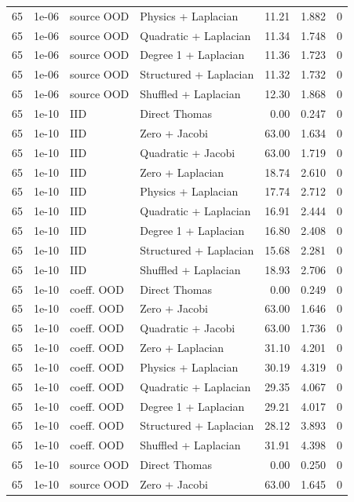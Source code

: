 \begin{longtable}{rlllrrr}
65 & 1e-06 & source OOD & Physics + Laplacian & 11.21 & 1.882 & 0 \\
65 & 1e-06 & source OOD & Quadratic + Laplacian & 11.34 & 1.748 & 0 \\
65 & 1e-06 & source OOD & Degree 1 + Laplacian & 11.36 & 1.723 & 0 \\
65 & 1e-06 & source OOD & Structured + Laplacian & 11.32 & 1.732 & 0 \\
65 & 1e-06 & source OOD & Shuffled + Laplacian & 12.30 & 1.868 & 0 \\
65 & 1e-10 & IID & Direct Thomas & 0.00 & 0.247 & 0 \\
65 & 1e-10 & IID & Zero + Jacobi & 63.00 & 1.634 & 0 \\
65 & 1e-10 & IID & Quadratic + Jacobi & 63.00 & 1.719 & 0 \\
65 & 1e-10 & IID & Zero + Laplacian & 18.74 & 2.610 & 0 \\
65 & 1e-10 & IID & Physics + Laplacian & 17.74 & 2.712 & 0 \\
65 & 1e-10 & IID & Quadratic + Laplacian & 16.91 & 2.444 & 0 \\
65 & 1e-10 & IID & Degree 1 + Laplacian & 16.80 & 2.408 & 0 \\
65 & 1e-10 & IID & Structured + Laplacian & 15.68 & 2.281 & 0 \\
65 & 1e-10 & IID & Shuffled + Laplacian & 18.93 & 2.706 & 0 \\
65 & 1e-10 & coeff. OOD & Direct Thomas & 0.00 & 0.249 & 0 \\
65 & 1e-10 & coeff. OOD & Zero + Jacobi & 63.00 & 1.646 & 0 \\
65 & 1e-10 & coeff. OOD & Quadratic + Jacobi & 63.00 & 1.736 & 0 \\
65 & 1e-10 & coeff. OOD & Zero + Laplacian & 31.10 & 4.201 & 0 \\
65 & 1e-10 & coeff. OOD & Physics + Laplacian & 30.19 & 4.319 & 0 \\
65 & 1e-10 & coeff. OOD & Quadratic + Laplacian & 29.35 & 4.067 & 0 \\
65 & 1e-10 & coeff. OOD & Degree 1 + Laplacian & 29.21 & 4.017 & 0 \\
65 & 1e-10 & coeff. OOD & Structured + Laplacian & 28.12 & 3.893 & 0 \\
65 & 1e-10 & coeff. OOD & Shuffled + Laplacian & 31.91 & 4.398 & 0 \\
65 & 1e-10 & source OOD & Direct Thomas & 0.00 & 0.250 & 0 \\
65 & 1e-10 & source OOD & Zero + Jacobi & 63.00 & 1.645 & 0 \\

\end{longtable}
